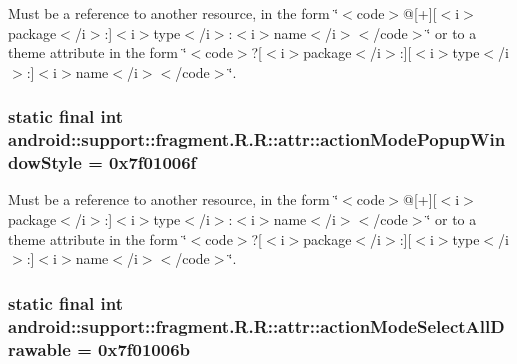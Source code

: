 Must be a reference to another resource, in the form \char`\"{}$<$code$>$@\mbox{[}+\mbox{]}\mbox{[}$<$i$>$package$<$/i$>$:\mbox{]}$<$i$>$type$<$/i$>$:$<$i$>$name$<$/i$>$$<$/code$>$\char`\"{} or to a theme attribute in the form \char`\"{}$<$code$>$?\mbox{[}$<$i$>$package$<$/i$>$:\mbox{]}\mbox{[}$<$i$>$type$<$/i$>$:\mbox{]}$<$i$>$name$<$/i$>$$<$/code$>$\char`\"{}. \hypertarget{classandroid_1_1support_1_1fragment_1_1_r_1_1attr_de1782494d1b1029fc9420f9d4719eb8}{
\subsubsection[{actionModePopupWindowStyle}]{\setlength{\rightskip}{0pt plus 5cm}static final int android::support::fragment.R.R::attr::actionModePopupWindowStyle = 0x7f01006f}}
\label{classandroid_1_1support_1_1fragment_1_1_r_1_1attr_de1782494d1b1029fc9420f9d4719eb8}


Must be a reference to another resource, in the form \char`\"{}$<$code$>$@\mbox{[}+\mbox{]}\mbox{[}$<$i$>$package$<$/i$>$:\mbox{]}$<$i$>$type$<$/i$>$:$<$i$>$name$<$/i$>$$<$/code$>$\char`\"{} or to a theme attribute in the form \char`\"{}$<$code$>$?\mbox{[}$<$i$>$package$<$/i$>$:\mbox{]}\mbox{[}$<$i$>$type$<$/i$>$:\mbox{]}$<$i$>$name$<$/i$>$$<$/code$>$\char`\"{}. \hypertarget{classandroid_1_1support_1_1fragment_1_1_r_1_1attr_9d21c22beb46818138f8f527ad590a00}{
\subsubsection[{actionModeSelectAllDrawable}]{\setlength{\rightskip}{0pt plus 5cm}static final int android::support::fragment.R.R::attr::actionModeSelectAllDrawable = 0x7f01006b}}
\label{classandroid_1_1support_1_1fragment_1_1_r_1_1attr_9d21c22beb46818138f8f527ad590a00}


